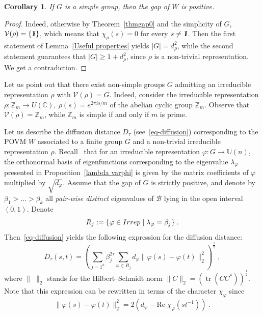 \documentclass[11pt]{article}
\newtheorem{coro}[theo]{Corollary}
\theoremstyle{definition}
\numberwithin{equation}{section}
\numberwithin{figure}{section}
\numberwithin{table}{section}
\DeclareMathOperator{\tr}{tr}
\newcommand{\Z}{{\mathbb{Z}}}
\newcommand{\cB}{{\mathcal{B}}}
\newcommand{\cV}{{\mathcal{V}}}
\newcommand*\id{{1\hskip-2.5pt{\rm l}}}
\renewcommand\geq {\geqslant}
\newcommand\< {\mathcal{h}}
\renewcommand\> {\mathcal{i}}
\begin{document}
\goodbreak

\begin{coro}\label{cor-simplegr}
If $G$ is a simple group, then the gap of $W$ is positive.
\end{coro}

\begin{proof}
Indeed, otherwise by Theorem~\ref{thmgap0} and the simplicity of $G$,
$\cV(\rho) = \{\id\}$, which means that $\chi_\rho(s) =0$ for every $s \neq \id$. Then the first statement of Lemma~\ref{Useful properties} yields $|G| = d_\rho^2$, while the second statement guarantees that $|G| \geq 1+ d_\rho^2$, since $\rho$ is a non-trivial representation. We get a contradiction.
\end{proof}



Let us point out that there exist non-simple groups $G$ admitting an irreducible representation $\rho$ with $\cV(\rho)=G$. Indeed, consider the irreducible representation $\rho:\mathbb{Z}_m\to U(\mathbb{C}),\ \rho(s)=e^{2\pi i s/m}$ of the abelian cyclic group $\mathbb{Z}_m$. Observe that $\cV(\rho) = \Z_m$, while $\Z_m$ is simple if and only if $m$ is prime.


Let us describe the diffusion distance $D_\tau$ (see~\eqref{eq-diffusion}) corresponding to the POVM $W$ associated to a finite group $G$ and a non-trivial irreducible representation $\rho$. Recall~\cite{Diaconis} that for an irreducible representation $\varphi: G \to \mathbb{U}(n)$, the orthonormal basis of eigenfunctions corresponding to the eigenvalue $\lambda_\varphi$ presented in Proposition~\ref{lambda varphi} is given by the matrix coefficients of $\varphi$ multiplied by $\sqrt{d_\varphi}$. Assume that the gap of $G$ is strictly positive, and denote by $\beta_1 > \dots > \beta_k$ all \emph{pair-wise distinct} eigenvalues of $\cB$ lying in the open interval $(0,1)$. Denote
\[
R_j := \{\varphi \in \textup{Irrep}\mid \lambda_{\varphi} = \beta_j\}\;.
\]
Then~\eqref{eq-diffusion} yields the following expression for the diffusion distance:
\begin{equation}\label{eq-diffusion-1}
D_\tau(s,t) = \left (\sum_{j=1^k} \beta_j^{2\tau} \sum_{\varphi \in R_j} d_\varphi \|\varphi(s)-\varphi(t)\|_2^2 \right)^{\frac{1}{2}} \;,
\end{equation}
where $\|\;\|_2$ stands for the Hilbert--Schmidt norm $\|C\|_2= (\tr (CC^*))^{\frac{1}{2}}$. Note that this expression can be rewritten in terms of the character $\chi_\varphi$ since
\[
\|\varphi(s)-\varphi(t)\|_2^2 = 2\left(d_\varphi- \text{Re}\;\chi_\varphi\left(st^{-1}\right)\right)\;.
\]
\end{document}

